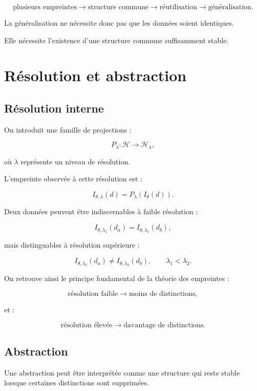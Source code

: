 \documentclass[11pt,a4paper]{article}
\begin{document}
\[
\boxed{
\text{plusieurs empreintes}
\rightarrow
\text{structure commune}
\rightarrow
\text{réutilisation}
\rightarrow
\text{généralisation}.
}
\]

La généralisation ne nécessite donc pas que les données soient identiques.

Elle nécessite l'existence d'une structure commune suffisamment stable.

\section{Résolution et abstraction}

\subsection{Résolution interne}

On introduit une famille de projections :

\[
P_\lambda:
\mathcal H
\rightarrow
\mathcal H_\lambda,
\]

où $\lambda$ représente un niveau de résolution.

L'empreinte observée à cette résolution est :

\[
I_{\theta,\lambda}(d)
=
P_\lambda(I_\theta(d)).
\]

Deux données peuvent être indiscernables à faible résolution :

\[
I_{\theta,\lambda_1}(d_a)
=
I_{\theta,\lambda_1}(d_b),
\]

mais distinguables à résolution supérieure :

\[
I_{\theta,\lambda_2}(d_a)
\neq
I_{\theta,\lambda_2}(d_b),
\qquad
\lambda_1<\lambda_2.
\]

On retrouve ainsi le principe fondamental de la théorie des empreintes :

\[
\boxed{
\text{résolution faible}
\rightarrow
\text{moins de distinctions},
}
\]

et :

\[
\boxed{
\text{résolution élevée}
\rightarrow
\text{davantage de distinctions}.
}
\]

\subsection{Abstraction}

Une abstraction peut être interprétée comme une structure qui reste stable
lorsque certaines distinctions sont supprimées.
\end{document}
